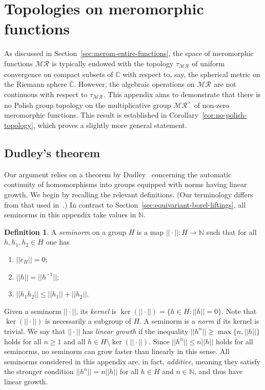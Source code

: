 \documentclass[12pt]{paper}
\numberwithin{equation}{section}
\theoremstyle{plain}
\theoremstyle{definition}
\newtheorem{definition}[theorem]{Definition}
\newcommand{\C}{\mathbb{C}}
\newcommand{\Cbar}{\overline{\mathbb{C}}}
\newcommand{\N}{\mathbb{N}}
\newcommand{\merom}[1][]{\mathcal{MR}_{#1}}
\newcommand{\meromnz}{\merom^{\times}}
\newcommand{\norm}[1]{||#1||}
\begin{document}
\section{Topologies on meromorphic functions}
\label{topol-divis-merom}

As discussed in Section~\ref{sec:merom-entire-functions}, the space of meromorphic functions
\(\merom\) is typically endowed with the topology \(\tau_{\merom}\) of uniform convergence on
compact subsets of \(\C\) with respect to, say, the spherical metric on the Riemann sphere
\(\Cbar\). However, the algebraic operations on \(\merom\) are not continuous with respect to
\(\tau_{\merom}\).  This appendix aims to demonstrate that there is no Polish group topology on the
multiplicative group \(\meromnz\) of non-zero meromorphic functions.  This result is established in
Corollary~\ref{cor:no-polish-topology}, which proves a slightly more general statement.

\subsection{Dudley's theorem}
\label{sec:dudley-thm}

Our argument relies on a theorem by Dudley~\cite{dudleyContinuityHomomorphisms1961} concerning the
automatic continuity of homomorphisms into groups equipped with norms having linear growth.  We
begin by recalling the relevant definitions.  (Our terminology differs from that used
in~\cite{dudleyContinuityHomomorphisms1961}.) In contrast to
Section~\ref{sec:equivariant-borel-liftings}, all seminorms in this appendix take values in \(\N\).

\begin{definition}
  \label{def:seminorm}
  A \emph{seminorm} on a group \(H\) is a map \(\norm{\cdot} : H \to \N\) such that for all
  \(h, h_{1}, h_{2} \in H\) one has
  \begin{enumerate}[leftmargin=.6cm, label={\sf \arabic*}., ref={\sf \arabic*}]
  \item \(\norm{e_{H}} = 0\);
  \item \(\norm{h} = \norm{h^{-1}}\);
  \item \(\norm{h_{1} h_{2}} \le \norm{h_{1}} + \norm{h_{2}}\).
  \end{enumerate}
\end{definition}

Given a seminorm \(\norm{\cdot}\), its \emph{kernel} is
\(\ker(\norm{\cdot}) = \{h \in H : \norm{h} = 0\}\).  Note that \(\ker(\norm{\cdot})\) is
necessarily a subgroup of \(H\).  A seminorm is a \emph{norm} if its kernel is trivial.  We say that
\(\norm{\cdot}\) has \emph{linear growth} if the inequality \(\norm{h^{n}} \ge \max\{n, \norm{h}\}\)
holds for all \(n \ge 1\) and all \(h \in H \setminus \ker(\norm{\cdot})\).  Since
\(\norm{h^{n}} \le n \norm{h}\) holds for all seminorms, no seminorm can grow faster than linearly
in this sense.  All seminorms considered in this appendix are, in fact, \emph{additive}, meaning
they satisfy the stronger condition \(\norm{h^{n}} = n\norm{h}\) for all \(h \in H\) and
\(n \in \N\), and thus have linear growth.
\end{document}

